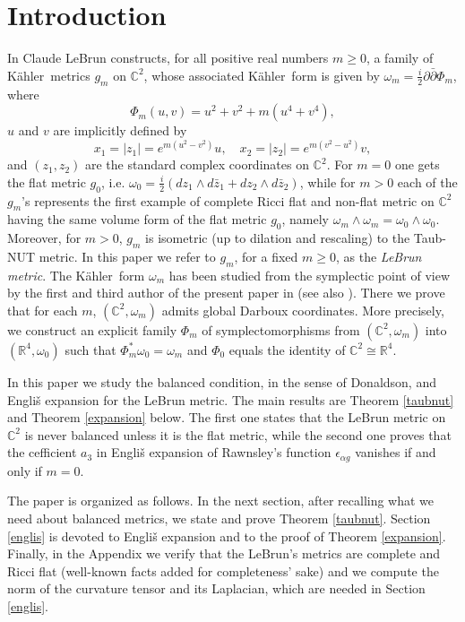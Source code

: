 \documentclass[11pt, reqno]{amsart}
\begin{document}
\section{Introduction}
 In \cite{LeBrun1} Claude LeBrun constructs, for all positive real numbers $m\geq 0$,
a  family of  {K\"{a}hler}\ metrics $g_m$  on ${\mathbb{C}}^2$,  whose associated {K\"{a}hler}\ form is given by
$\omega_m = \frac{i}{2} \partial \bar \partial \Phi_m$, where
\begin{equation}\label{Phim}
\Phi_m(u,v) = u^2 + v^2 + m (u^4 + v^4),
\end{equation}
 $u$ and $v$ are implicitly defined by
 \begin{equation}\label{x1z1}
 x_1= |z_1| =
e^{m(u^2-v^2)} u,\quad  x_2=|z_2| = e^{m(v^2-u^2)} v,
\end{equation}
and $(z_1, z_2)$ are the standard complex coordinates on ${\mathbb{C}}^2$.
 For $m = 0$ one
gets the flat metric $g_0$, i.e.  $\omega_0=\frac{i}{2}\left(dz_1\wedge d\bar z_1+dz_2\wedge d\bar z_2\right)$, while for $m>0$ each of the $g_m$'s
represents
 the first example of complete Ricci flat  and non-flat metric on ${\mathbb{C}}^2$ having the same
volume form of the flat metric $g_0$, namely
$\omega_m\wedge\omega_m=\omega_0\wedge\omega_0$.
 Moreover, for $m>0$,
$g_m$ is  isometric (up to dilation and rescaling)   to the
Taub-NUT  metric. In this paper  we refer to $g_m$, for a fixed $m\geq 0$, as the   {\em LeBrun  metric}.
The {K\"{a}hler}\ form $\omega_m$   has  been studied from the symplectic point of view by the first and third author of the present paper in
\cite{sympTN} (see also \cite{globsymp}). There we prove that for each $m$, $({\mathbb{C}}^2, \omega_m)$
admits  global  Darboux coordinates. More precisely,  we construct an explicit  family $\Phi_m$ of symplectomorphisms  from $({\mathbb{C}}^2, \omega_m)$ into $({\mathbb{R}}^4, \omega_0)$ such that $\Phi_m^*\omega_0=\omega_m$
and $\Phi_0$ equals the identity of ${\mathbb{C}}^2\cong{\mathbb{R}}^4$.

In this paper we  study the  balanced condition, in the sense of Donaldson, and  Engli\v{s} expansion  for the LeBrun metric.
The main results are Theorem \ref{taubnut} and Theorem \ref{expansion} below. The first one states that the LeBrun metric on ${\mathbb{C}}^2$ is never balanced unless it is the flat metric, while the second one proves that the cefficient $a_3$ in Engli\v{s} expansion of Rawnsley's function $\epsilon_{\alpha g}$ vanishes if and only if $m=0$.

The paper is organized as follows. In the next section, after recalling what we need about balanced metrics, we state and prove Theorem \ref{taubnut}. Section \ref{englis} is devoted to Engli\v{s} expansion and to the proof of Theorem \ref{expansion}. Finally, in the Appendix we verify that the LeBrun's metrics are complete and Ricci flat (well-known facts added for completeness' sake) and we compute the norm of the curvature tensor and its Laplacian, which are needed in Section \ref{englis}.
\end{document}

